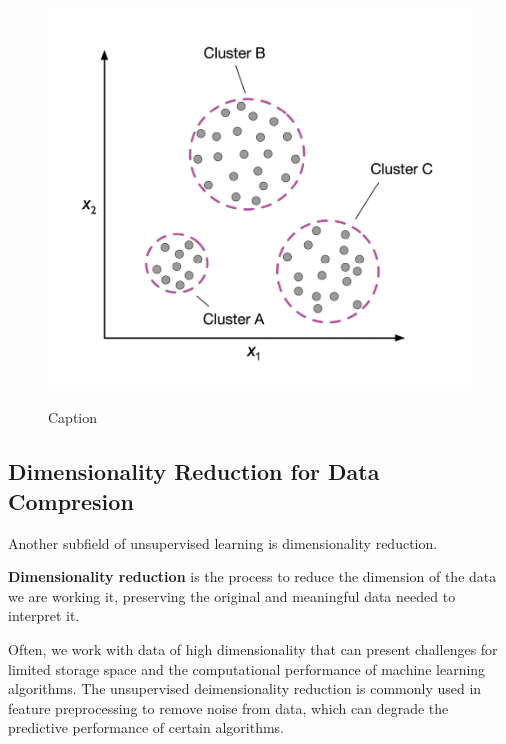 \documentclass[../machine_learning_scikit.tex]{subfiles}
\begin{document}
    \begin{figure}[h]
        \begin{minipage}{\textwidth}
            \centering
            \includegraphics[scale=1]{images/_f1d6cf52eb8a474ca861d36f25bf29ef_9781801819312_01_06.png} \\
            \caption{Caption}
            \label{Texto}
        \end{minipage}
    \end{figure}

    \subsection{Dimensionality Reduction for Data Compresion}

    Another subfield of unsupervised learning is dimensionality reduction.

    \begin{mydef}
        \textbf{Dimensionality reduction} is the process to reduce the dimension of the data we are working it, preserving the original and meaningful data needed to interpret it.
    \end{mydef}

    Often, we work with data of high dimensionality that can present challenges for limited storage space and the computational performance of machine learning algorithms. The unsupervised deimensionality reduction is commonly used in feature preprocessing to remove noise from data, which can degrade the predictive performance of certain algorithms.
\end{document}
